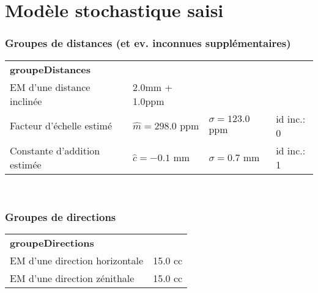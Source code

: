 \documentclass[a4paper, 9pt]{report}
\newcommand{\edithrulefill}{
        \vspace*{-6pt}
        \hrulefill
    }
\begin{document}
                \section{Modèle stochastique saisi}
                
                   \subsubsection{Groupes de distances (et ev. inconnues supplémentaires)}
                    \edithrulefill
                    \vspace*{6pt}
                    
                                 \begin{tabular}{p{6cm} p{3.5cm} p{3.5cm} l}
                                    \textbf{groupeDistances}  &    &   &    \\
                                    EM d'une distance inclinée & 2.0mm + 1.0ppm &   &  \\
                                    Facteur d'échelle estimé & $\hat{m} = 298.0$  ppm & $\sigma = 123.0$ ppm & id inc.: 0\\
                                    Constante d'addition estimée        & $\hat{c} = -0.1 $ mm            & $\sigma = 0.7$ mm  & id inc.: 1\\
                                \end{tabular}
                                \vspace*{8pt}\\
                   \subsubsection{Groupes de directions}
                    \edithrulefill
                    \vspace*{6pt}
                    
                                   \begin{tabular}{p{6cm} p{3.5cm}}
                                       \textbf{groupeDirections} & \\
                                       EM d'une direction horizontale  & 15.0 cc \\
                                       EM d'une direction zénithale    & 15.0 cc \\
                                   \end{tabular}
                                   \vspace*{8pt}\\
\end{document}
